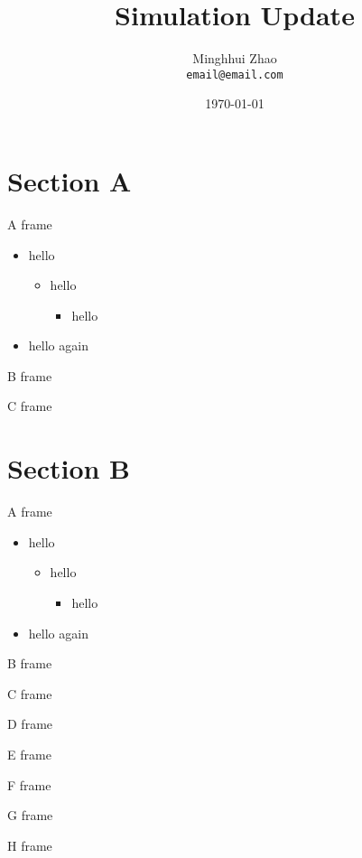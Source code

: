 \documentclass{beamer}
\title{Simulation Update}
\institute{ISU \& BNL}
\date[]{\today}
\author[M.H Zhao]{Minghhui Zhao\\\texttt{email@email.com}}
\begin{document}
\begin{frame}
\titlepage
\end{frame}

\section{Section A}
\begin{frame}{A frame}
\begin{itemize}
\item hello
\begin{itemize}
\item hello
\begin{itemize}
\item hello
\end{itemize}
\end{itemize}
\item hello again
\end{itemize}
\end{frame}
\begin{frame}{B frame}
\end{frame}
\begin{frame}{C frame}
\end{frame}

\section{Section B}
\begin{frame}{A frame}
\begin{itemize}
\item hello
\begin{itemize}
\item hello
\begin{itemize}
\item hello
\end{itemize}
\end{itemize}
\item hello again
\end{itemize}
\end{frame}
\begin{frame}{B frame}
\end{frame}
\begin{frame}{C frame}
\end{frame}
\begin{frame}{D frame}
\end{frame}
\begin{frame}{E frame}
\end{frame}
\begin{frame}{F frame}
\end{frame}
\begin{frame}{G frame}
\end{frame}
\begin{frame}{H frame}
\end{frame}
\end{document}
